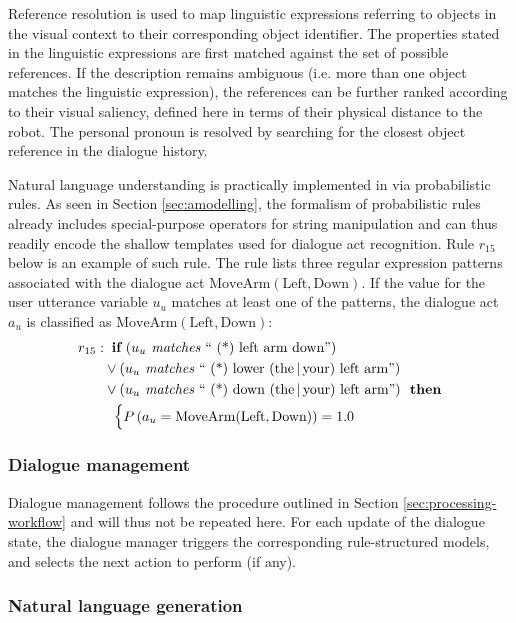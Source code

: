 Reference resolution is used to map linguistic expressions referring to objects in the visual context to their corresponding object identifier. The properties stated in the linguistic expressions are first matched against the set of possible references.  If the description remains ambiguous (i.e. more than one object matches the linguistic expression), the references can be further ranked according to their visual saliency, defined here in terms of their physical distance to the robot.  The personal pronoun  is resolved by searching for the closest object reference in the dialogue history. 

Natural language understanding is practically implemented in \opendial via probabilistic rules.  As seen in Section \ref{sec:amodelling}, the formalism of probabilistic rules already includes special-purpose operators for string manipulation and can thus readily encode the shallow templates used for dialogue act recognition.  Rule $r_{15}$ below is an example of such rule.  The rule lists three regular expression patterns associated with the dialogue act $\mathrm{MoveArm(Left,Down)}$.  If the value for the user utterance variable $u_u$ matches at least one of the patterns, the dialogue act $a_u$ is classified as $\mathrm{MoveArm(Left,Down)}$:
\begin{align*}
r_{15}: &\;\;\textbf{if} \ (u_u \textit{ matches } \text{`` (*) left arm down''} ) \\ 
& \lor (u_u \textit{ matches } \text{`` (*) lower (the\,|\,your) left arm''} ) \\
& \lor (u_u \textit{ matches } \text{`` (*) down (the\,|\,your) left arm''}   )  \ \ \textbf{then} \\ 
& \; \; \begin{cases} P\left(a_u = \mathrm{MoveArm(Left,Down)}\right) = 1.0 \end{cases}
\end{align*}

\subsubsection*{Dialogue management}

Dialogue management follows the procedure outlined in Section \ref{sec:processing-workflow} and will thus not be repeated here. For each update of the dialogue state, the dialogue manager triggers the corresponding rule-structured models, and selects the next action to perform (if any). 

\subsubsection*{Natural language generation}

